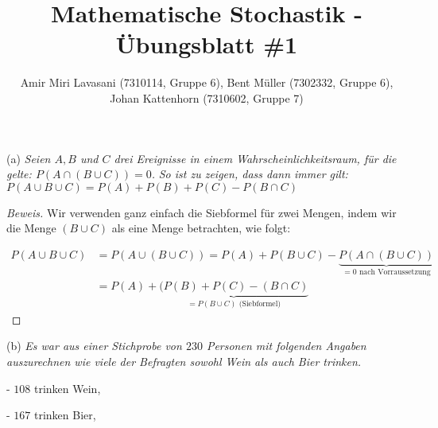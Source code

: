 \documentclass[10pt]{article}
\newenvironment{Aufgabe}[2][Aufgabe]{\begin{trivlist}
\item[\hskip \labelsep {\bfseries #1}\hskip \labelsep {\bfseries #2.}]}{\end{trivlist}}
\begin{document}
 
\title{ \textbf{Mathematische Stochastik - Übungsblatt \#1} }

\author{Amir Miri Lavasani (7310114, Gruppe 6), Bent Müller (7302332, Gruppe 6), \\ 
Johan Kattenhorn (7310602, Gruppe 7)} \maketitle

\begin{Aufgabe}{3}

\end{Aufgabe}

(a) \textit{Seien $A, B$ und $C$ drei Ereignisse in einem Wahrscheinlichkeitsraum, für die gelte: $P(A \cap (B \cup C)) = 0$.}
\textit{So ist zu zeigen, dass dann immer gilt: $P(A \cup B \cup C) = P(A) + P(B) + P(C) - P(B \cap C)$}
\begin{proof}[Beweis]
Wir verwenden ganz einfach die Siebformel für zwei Mengen, indem wir die Menge $(B \cup C)$ als eine Menge betrachten, wie folgt:

\begin{align*}
P(A \cup B \cup C) &= P(A \cup (B \cup C)) = P(A) + P(B \cup C) - \underbrace{ P(A \cap (B \cup C)) }_{\text{$= 0$ nach Vorraussetzung}} \\
&= P(A) + \underbrace{(P(B) + P(C) - (B \cap C)}_{\text{$= P(B \cup C)$ (Siebformel)}}
\end{align*}

\end{proof}

(b) \textit{Es war aus einer Stichprobe von $230$ Personen mit folgenden Angaben auszurechnen wie viele der Befragten sowohl Wein als auch Bier trinken.}

- $108$ trinken Wein,

- $167$ trinken Bier,
\end{document}
